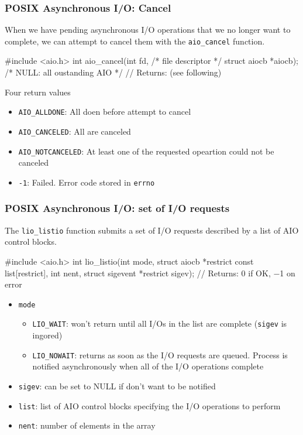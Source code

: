 \documentclass[newPxFont,sthlmFooter,nooffset]{beamer}
\begin{document}
\begin{frame}[t, fragile]
  \frametitle{POSIX Asynchronous I/O: Cancel}
When we have pending asynchronous I/O operations that we no longer want to complete, we can attempt to cancel them with the \texttt{aio\_cancel} function.

\begin{codedef}
#include <aio.h>
int aio_cancel(int fd, /* file descriptor */
              struct aiocb *aiocb); /* NULL: all oustanding AIO */
// Returns: (see following)
\end{codedef}

Four return values
\begin{itemize}
\item \texttt{AIO\_ALLDONE}: All doen before attempt to cancel
\item \texttt{AIO\_CANCELED}: All are canceled
\item \texttt{AIO\_NOTCANCELED}: At least one of the requested opeartion could not be canceled
\item \texttt{-1}: Failed. Error code stored in \texttt{errno} 
\end{itemize}

\end{frame}

\begin{frame}[t, fragile]
  \frametitle{POSIX Asynchronous I/O: set of I/O requests}
 The \texttt{lio\_listio} function submits a set of I/O requests described by a list of AIO control blocks.
 \begin{codedef}
#include <aio.h>
int lio_listio(int mode, struct aiocb *restrict const list[restrict],
               int nent, struct sigevent *restrict sigev);
// Returns: 0 if OK, −1 on error
 \end{codedef}

 \begin{itemize}
 \item \texttt{mode}
   \begin{itemize}
   \item \texttt{LIO\_WAIT}: won't return until all I/Os in the list are complete (\texttt{sigev} is ingored)
   \item \texttt{LIO\_NOWAIT}: returns as soon as the I/O requests are queued. Process is notified asynchronously when all of the I/O operations complete
   \end{itemize}
 \item \texttt{sigev}: can be set to NULL if don't want to be notified
 \item \texttt{list}: list of AIO control blocks specifying the I/O operations to perform
 \item \texttt{nent}: number of elements in the array
 \end{itemize}

\end{frame}
\end{document}
